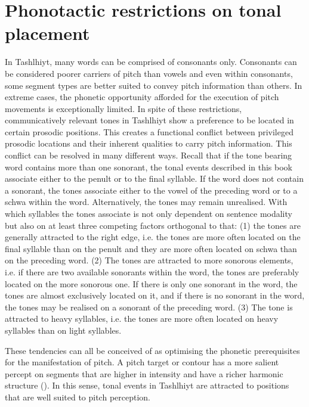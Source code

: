 \section{Phonotactic restrictions on tonal placement}
In Tashlhiyt, many words can be comprised of consonants only. Consonants can be considered poorer carriers of pitch than vowels and even within consonants, some segment types are better suited to convey pitch information than others. In extreme cases, the phonetic opportunity afforded for the execution of pitch movements is exceptionally limited. In spite of these restrictions, communicatively relevant tones in Tashlhiyt show a preference to be located in certain prosodic positions. This creates a functional conflict between privileged prosodic locations and their inherent qualities to carry pitch information. This conflict can be resolved in many different ways. Recall that if the tone bearing word contains more than one sonorant, the tonal events described in this book associate either to the penult or to the final syllable. If the word does not contain a sonorant, the tones associate either to the vowel of the preceding word or to a schwa within the word. Alternatively, the tones may remain unrealised. With which syllables the tones associate is not only dependent on sentence modality but also on at least three competing factors orthogonal to that: (1) the tones are generally attracted to the right edge, i.e. the tones are more often located on the final syllable than on the penult and they are more often located on schwa than on the preceding word. (2) The tones are attracted to more sonorous elements, i.e. if there are two available sonorants within the word, the tones are preferably located on the more sonorous one. If there is only one sonorant in the word, the tones are almost exclusively located on it, and if there is no sonorant in the word, the tones may be realised on a sonorant of the preceding word. (3) The tone is attracted to heavy syllables, i.e. the tones are more often located on heavy syllables than on light syllables. 

These tendencies can all be conceived of as optimising the phonetic prerequisites for the manifestation of pitch. A pitch target or contour has a more salient percept on segments that are higher in intensity and have a richer harmonic structure (\citealt{Zhang2004,Barnes.etal2014}). In this sense, tonal events in Tashlhiyt are attracted to positions that are well suited to pitch perception.

